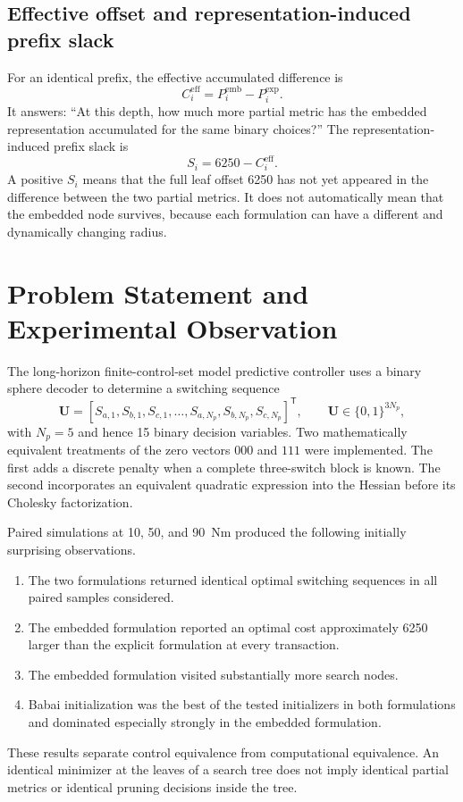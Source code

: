 \documentclass[paper=a4,oneside,fontsize=12pt,DIV=14,headings=normal,parskip=half,headsepline,numbers=noendperiod]{scrreprt}
\newcommand{\vct}[1]{\bm{#1}}
\newcommand{\T}{\mathsf{T}}
\begin{document}
\section{Effective offset and representation-induced prefix slack}
For an identical prefix, the effective accumulated difference is
\begin{equation}
 C_i^{\mathrm{eff}}=P_i^{\mathrm{emb}}-P_i^{\mathrm{exp}}.
\end{equation}
It answers: ``At this depth, how much more partial metric has the embedded
representation accumulated for the same binary choices?''  The
representation-induced prefix slack is
\begin{equation}
 S_i=6250-C_i^{\mathrm{eff}}.
\end{equation}
A positive $S_i$ means that the full leaf offset 6250 has not yet appeared in
the difference between the two partial metrics.  It does not automatically
mean that the embedded node survives, because each formulation can have a
different and dynamically changing radius.

\chapter{Problem Statement and Experimental Observation}

The long-horizon finite-control-set model predictive controller uses a binary
sphere decoder to determine a switching sequence
\begin{equation}
 \vct U=[S_{a,1},S_{b,1},S_{c,1},\ldots,S_{a,N_p},S_{b,N_p},S_{c,N_p}]^\T,
 \qquad \vct U\in\{0,1\}^{3N_p},
\end{equation}
with $N_p=5$ and hence 15 binary decision variables.  Two mathematically
equivalent treatments of the zero vectors $000$ and $111$ were implemented.
The first adds a discrete penalty when a complete three-switch block is known.
The second incorporates an equivalent quadratic expression into the Hessian
before its Cholesky factorization.

Paired simulations at 10, 50, and 90~Nm produced the following initially
surprising observations.
\begin{enumerate}
 \item The two formulations returned identical optimal switching sequences in
 all paired samples considered.
 \item The embedded formulation reported an optimal cost approximately 6250
 larger than the explicit formulation at every transaction.
 \item The embedded formulation visited substantially more search nodes.
 \item Babai initialization was the best of the tested initializers in both
 formulations and dominated especially strongly in the embedded formulation.
\end{enumerate}
These results separate control equivalence from computational equivalence.  An
identical minimizer at the leaves of a search tree does not imply identical
partial metrics or identical pruning decisions inside the tree.
\end{document}
